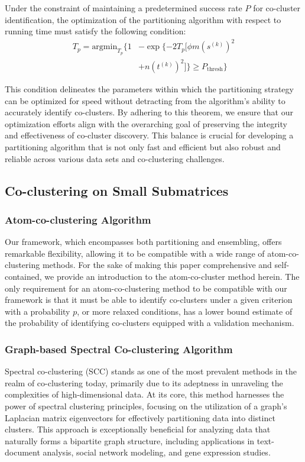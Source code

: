 Under the constraint of maintaining a predetermined success rate $P$ for co-cluster identification, the optimization of the partitioning algorithm with respect to running time must satisfy the following condition:
\begin{align*}
    T_p = \text{argmin}_{T_p} \{ 
     1 &- \exp \{ -2 T_p [\phi m (s^{(k)})^2 \\
     &+ n (t^{(k)})^2] \} \ge P_{\text{thresh}} \} 
\end{align*}


This condition delineates the parameters within which the partitioning strategy can be optimized for speed without detracting from the algorithm's ability to accurately identify co-clusters. By adhering to this theorem, we ensure that our optimization efforts align with the overarching goal of preserving the integrity and effectiveness of co-cluster discovery. This balance is crucial for developing a partitioning algorithm that is not only fast and efficient but also robust and reliable across various data sets and co-clustering challenges.

\subsection{Co-clustering on Small Submatrices}

\subsubsection{Atom-co-clustering Algorithm}
Our framework, which encompasses both partitioning and ensembling, offers remarkable flexibility, allowing it to be compatible with a wide range of atom-co-clustering methods. For the sake of making this paper comprehensive and self-contained, we provide an introduction to the atom-co-cluster method herein. The only requirement for an atom-co-clustering method to be compatible with our framework is that it must be able to identify co-clusters under a given criterion with a probability $p$, or more relaxed conditions, has a lower bound estimate of the probability of identifying co-clusters equipped with a validation mechanism.

\subsubsection{Graph-based Spectral Co-clustering Algorithm}

Spectral co-clustering (SCC) stands as one of the most prevalent methods in the realm of co-clustering today\cite{vonluxburg2007TutorialSpectralClustering}, primarily due to its adeptness in unraveling the complexities of high-dimensional data. At its core, this method harnesses the power of spectral clustering principles, focusing on the utilization of a graph's Laplacian matrix eigenvectors for effectively partitioning data into distinct clusters. This approach is exceptionally beneficial for analyzing data that naturally forms a bipartite graph structure, including applications in text-document analysis, social network modeling, and gene expression studies.


